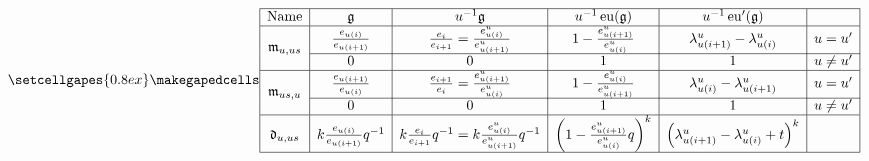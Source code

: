 \documentclass[border={7pt 0pt 90pt 0pt},varwidth]{standalone}
\DeclareMathOperator{\eu}{\operatorname{eu}}
\begin{document}
\begin{table}[ht]
 \[
 \setcellgapes{0.8ex}\makegapedcells
\centering
 \begin{array}{|c|c|c|c|c|c|}
\hline
\text{Name}         & \mathfrak{g}                 & u^{-1}\mathfrak{g}                                           & u^{-1}\eu(\mathfrak{g})                                & u^{-1}\eu'(\mathfrak{g})                                 &           \\ \hline
\multirow{2}{*}{$\mathfrak{m}_{u,us}$} & \frac{e_{u(i)}}{e_{u(i+1)}}  & \frac{e_{i}}{e_{i+1}}= \frac{e_{u(i)}^{u}}{e_{u(i+1)}^{u}}   & 1-\frac{e_{u(i+1)}^{u}}{e_{u(i)}^{u}}                  & \lambda_{u(i+1)}^{u}-\lambda_{u(i)}^{u}                  & u=u'      \\ \cline{2-6}
                    & 0                            & 0                                                            & 1                                                      & 1                                                        & u \neq u' \\ \hline
\multirow{2}{*}{$\mathfrak{m}_{us,u}$} & \frac{e_{u(i+1)}}{e_{u(i)}}  & \frac{e_{i+1}}{e_{i}}= \frac{e_{u(i+1)}^{u}}{e_{u(i)}^{u}}   & 1-\frac{e_{u(i)}^{u}}{e_{u(i+1)}^{u}}                  & \lambda_{u(i)}^{u}-\lambda_{u(i+1)}^{u}                  & u=u'      \\ \cline{2-6}
                    & 0                            & 0                                                            & 1                                                      & 1                                                        & u \neq u' \\ \hline
\mathfrak{d}_{u,us} & k\frac{e_{u(i)}}{e_{u(i+1)}}q^{-1} & k\frac{e_{i}}{e_{i+1}}q^{-1}= k\frac{e_{u(i)}^{u}}{e_{u(i+1)}^{u}}q^{-1} & \left(1-\frac{e_{u(i+1)}^{u}}{e_{u(i)}^{u}}q\right)^{k} & \left(\lambda_{u(i+1)}^{u}-\lambda_{u(i)}^{u}+t\right)^{k} &           \\ \hline
 \end{array}
 \]
        
\end{table}
\end{document}
